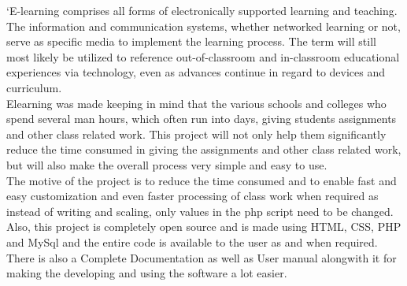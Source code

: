 \begin{Large}
\end{Large}
‘E-learning comprises all forms of electronically supported learning and teaching. The information and communication systems, whether networked learning or not, serve as specific media to implement the learning process. The term will still most likely be utilized to reference out-of-classroom and in-classroom educational experiences via technology, even as advances continue in regard to devices and curriculum.\\

\noindent Elearning was made keeping in mind that the various schools and colleges who spend several man hours, which often run into days, giving students assignments and other class related work. This project will not only help them significantly reduce the time consumed in giving the assignments and other class related work, but will also make the overall process very simple and easy to use.\\

\noindent The motive of the project is to reduce the time consumed and to enable fast and
easy customization and even faster processing of class work when required as instead of writing and
scaling, only values in the php script need to be changed.\\

\noindent Also, this project is completely open source and is made using HTML, CSS, PHP and MySql and the entire code is available to the user as and when required. There is also a Complete Documentation as well as User manual alongwith it for making the 
developing and using the software a lot easier.
